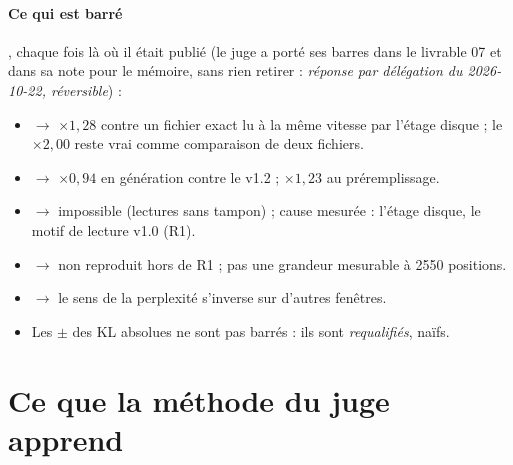 \paragraph{Ce qui est barré}, chaque fois là où il était publié (le juge a porté ses barres dans le livrable 07 et dans sa note pour le mémoire, sans rien retirer : \emph{réponse par délégation du 2026-10-22, réversible}) :
\begin{itemize}
\item {} $\to$ $\times 1{,}28$ contre un fichier exact lu à la même vitesse par l'étage disque ; le $\times 2{,}00$ reste vrai comme comparaison de deux fichiers.
\item {} $\to$ $\times 0{,}94$ en génération contre le v1.2 ; $\times 1{,}23$ au préremplissage.
\item {} $\to$ impossible (lectures sans tampon) ; cause mesurée : l'étage disque,  le motif de lecture v1.0 (R1).
\item {} $\to$ non reproduit hors de R1 ; pas une grandeur mesurable à \num{2550} positions.
\item {} $\to$ le sens de la perplexité s'inverse sur d'autres fenêtres.
\item Les $\pm$ des KL absolues ne sont pas barrés : ils sont \emph{requalifiés}, naïfs.
\end{itemize}

\section{Ce que la méthode du juge apprend}\label{t3jug:sec:recettes}

